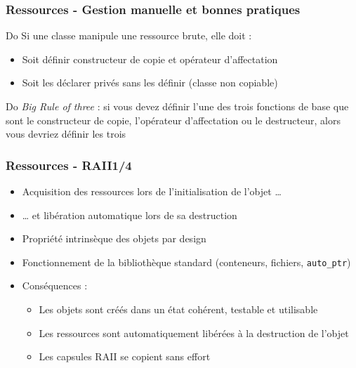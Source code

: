 \documentclass[C++.tex]{subfiles}
\begin{document}
\begin{frame}
	\frametitle{Ressources - Gestion manuelle et bonnes pratiques}
	\begin{exampleblock}{Do}
		Si une classe manipule une ressource brute, elle doit :
		\begin{itemize}
			\item Soit définir constructeur de copie et opérateur d'affectation
			\item Soit les déclarer privés sans les définir (classe non copiable)
		\end{itemize}
	\end{exampleblock}

	\begin{exampleblock}{Do}
		\textit{Big Rule of three} : si vous devez définir l'une des trois fonctions de base que sont le constructeur de copie, l'opérateur d'affectation ou le destructeur, alors vous devriez définir les trois


	\end{exampleblock}

\end{frame}

\begin{frame}
	\frametitle{Ressources - RAII\titlehfill{}1/4}


	\begin{itemize}
		\item Acquisition des ressources lors de l'initialisation de l'objet \ldots
		\item \ldots{} et libération automatique lors de sa destruction


		\item Propriété intrinsèque des objets \og par design\fg{}


		\item Fonctionnement de la bibliothèque standard (conteneurs, fichiers, \lstinline|auto_ptr|)
		\item Conséquences :
		\begin{itemize}
			\item Les objets sont créés dans un état cohérent, testable et utilisable
			\item Les ressources sont automatiquement libérées à la destruction de l'objet

			
			\item Les capsules RAII se copient sans effort
		\end{itemize}
	\end{itemize}
\end{frame}
\end{document}
